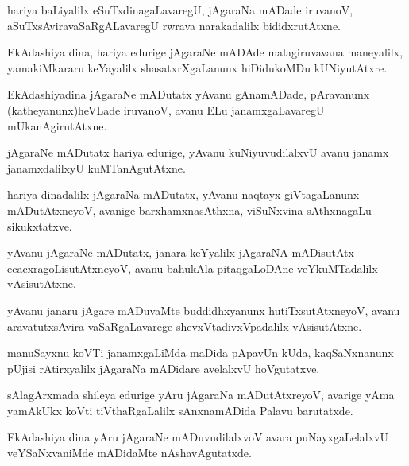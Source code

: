 \documentclass{article}
\begin{document}
\begin{mn}%
hariya baLiyalilx eSuTxdinagaLavaregU, jAgaraNa mADade iruvanoV, aSuTxsAviravaSaRgALavaregU rwrava 
narakadalilx bididxrutAtxne.
\end{mn}

\begin{mn}%
EkAdashiya dina, hariya edurige jAgaraNe mADAde malagiruvavana maneyalilx, yamakiMkararu keYayalilx 
shasatxrXgaLanunx hiDidukoMDu kUNiyutAtxre.
\end{mn}

\begin{mn}%
EkAdashiyadina jAgaraNe mADutatx yAvanu gAnamADade, pAravanunx (katheyanunx)heVLade iruvanoV, avanu 
ELu  janamxgaLavaregU mUkanAgirutAtxne.
\end{mn}

\begin{mn}%
jAgaraNe mADutatx hariya edurige, yAvanu kuNiyuvudilalxvU avanu janamx janamxdalilxyU kuMTanAgutAtxne.
\end{mn}

\begin{mn}%
hariya dinadalilx jAgaraNa mADutatx, yAvanu naqtayx giVtagaLanunx mADutAtxneyoV, avanige 
barxhamxnasAthxna, viSuNxvina sAthxnagaLu sikukxtatxve.
\end{mn}

\begin{mn}%
yAvanu jAgaraNe mADutatx, janara keYyalilx jAgaraNA mADisutAtx ecacxragoLisutAtxneyoV, avanu 
bahukAla pitaqgaLoDAne veYkuMTadalilx vAsisutAtxne.
\end{mn}

\begin{mn}%
yAvanu janaru jAgare mADuvaMte buddidhxyanunx hutiTxsutAtxneyoV, avanu  aravatutxsAvira 
vaSaRgaLavarege shevxVtadivxVpadalilx  vAsisutAtxne.
\end{mn}

\begin{mn}%
manuSayxnu koVTi janamxgaLiMda maDida pApavUn kUda, kaqSaNxnanunx pUjisi rAtirxyalilx jAgaraNa 
mADidare avelalxvU hoVgutatxve.
\end{mn}

\begin{mn}%
sAlagArxmada shileya edurige yAru jAgaraNa mADutAtxreyoV, avarige yAma yamAkUkx koVti 
tiVthaRgaLalilx sAnxnamADida Palavu barutatxde.
\end{mn}

\begin{mn}%
EkAdashiya dina yAru jAgaraNe mADuvudilalxvoV avara puNayxgaLelalxvU veYSaNxvaniMde mADidaMte 
nAshavAgutatxde.
\end{mn}
\end{document}
